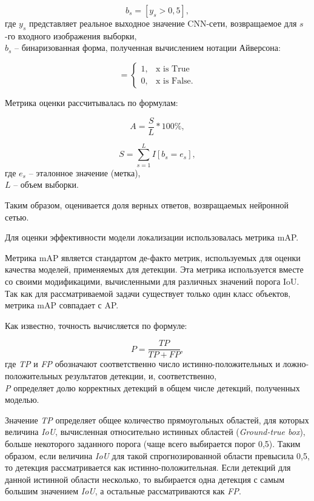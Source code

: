 \begin{equation*}
    b_s = [y_s > 0,5],
\end{equation*}
где $y_s$ представляет реальное выходное значение CNN-сети, возвращаемое для $s$-го входного изображения выборки,\\
$b_s$ -- бинаризованная форма, полученная вычислением нотации Айверсона:

\begin{equation*}
    [x] = 
    \begin{cases}
        1, & \text{x is True} \\
        0, & \text{x is False}.
    \end{cases}
\end{equation*}

Метрика оценки рассчитывалась по формулам:

\begin{equation*}
    A = \frac{S}{L} * 100\%,
\end{equation*}

\begin{equation*}
    S = \sum_{s=1}^L I[b_s = e_s],
\end{equation*}
где $e_s$ -- эталонное значение (метка),\\
$L$ -- объем выборки. 

Таким образом, оценивается доля верных ответов, возвращаемых нейронной сетью.

Для оценки эффективности модели локализации использовалась метрика mAP.

Метрика mAP является стандартом де-факто метрик, используемых для оценки качества моделей, применяемых для детекции. Эта метрика используется вместе со своими модификацими, вычисленными для различных значений порога IoU. Так как для рассматриваемой задачи существует только один класс объектов, метрика mAP совпадает с AP.

Как известно, точность вычисляется по формуле:

\begin{equation*}
    P = \frac{TP}{TP + FP},
\end{equation*}
где \textit{TP} и \textit{FP} обозначают соответственно число истинно-положительных и ложно-положительных результатов детекции, и, соответственно,\\
\textit{P} определяет долю корректных детекций в общем числе детекций, полученных моделью.

Значение \textit{TP} определяет общее количество прямоугольных областей, для которых величина \textit{IoU}, вычисленная относительно истинных областей (\textit{Ground-true box}), больше некоторого заданного порога (чаще всего выбирается порог 0,5). Таким образом, если величина \textit{IoU} для такой спрогнозированной области превысила 0,5, то детекция рассматривается как истинно-положительная. Если детекций для данной истинной области несколько, то выбирается одна детекция с самым большим значением \textit{IoU}, а остальные рассматриваются как \textit{FP}.

